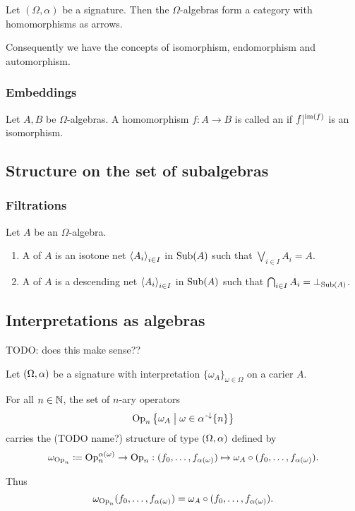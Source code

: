 \begin{proposition}
Let $(\Omega,\alpha)$ be a signature. Then the $\Omega$-algebras form a category with homomorphisms as arrows.
\end{proposition}
Consequently we have the concepts of isomorphism, endomorphism and automorphism.

\subsubsection{Embeddings}
\begin{definition}
Let $A,B$ be $\Omega$-algebras. A homomorphism $f:A\to B$ is called an  if $f|^{\operatorname{im}(f)}$ is an isomorphism.
\end{definition}

\subsection{Structure on the set of subalgebras}
\subsubsection{Filtrations}
\begin{definition}
Let $A$ be an $\Omega$-algebra.
\begin{enumerate}
\item A  of $A$ is an isotone net $\left\langle A_i \right\rangle_{i\in I}$ in $\operatorname{Sub}(A)$ such that $\bigvee_{i\in I}A_i = A$.
\item A  of $A$ is a descending net $\left\langle A_i \right\rangle_{i\in I}$ in $\operatorname{Sub}(A)$ such that $\bigcap_{i\in I}A_i = \bot_{\operatorname{Sub}(A)}$.
\end{enumerate}
\end{definition}

\subsection{Interpretations as algebras}
TODO: does this make sense??
\begin{definition}
Let $\sSet{\Omega, \alpha}$ be a signature with interpretation $\{\omega_A\}_{\omega\in \Omega}$ on a carier $A$.

For all $n\in \mathbb{N}$, the set of $n$-ary operators
\[ \Op_n \setbuilder{\omega_A}{\omega\in \alpha^{\preimf}\{n\}} \]
carries the  (TODO name?) structure of type $\sSet{\Omega, \alpha}$ defined by
\[ \omega_{\operatorname{Op}_n} \coloneqq \operatorname{Op}_n^{\alpha(\omega)}\to \operatorname{Op}_n: (f_0,\ldots, f_{\alpha(\omega)}) \mapsto \omega_A\circ (f_0,\ldots, f_{\alpha(\omega)}). \]
\end{definition}
Thus
\[ \omega_{\operatorname{Op}_n}(f_0,\ldots, f_{\alpha(\omega)}) = \omega_A\circ (f_0,\ldots, f_{\alpha(\omega)}). \]

